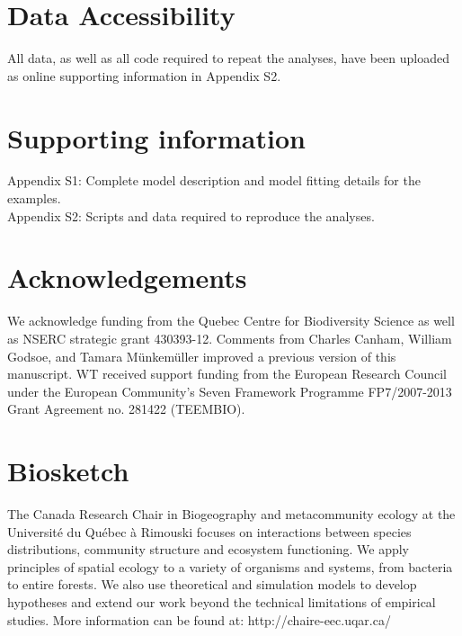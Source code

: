 \documentclass[11pt]{article}
\begin{document}
\section*{Data Accessibility}
All data, as well as all code required to repeat the analyses, have been uploaded as online supporting information in Appendix S2.


%
%
\section*{Supporting information}
Appendix S1: Complete model description and model fitting details for the examples. \\
Appendix S2: Scripts and data required to reproduce the analyses.

\section*{Acknowledgements}
We acknowledge funding from the Quebec Centre for Biodiversity Science as well as NSERC strategic grant 430393-12. Comments from Charles Canham, William Godsoe, and Tamara Münkemüller improved a previous version of this manuscript. WT received support funding from the European Research Council under the European Community's Seven Framework Programme FP7/2007-2013 Grant Agreement no. 281422 (TEEMBIO). 

\nolinenumbers

%
%

\renewcommand\refname{Literature Cited}
{}



%
%

\section*{Biosketch}
The Canada Research Chair in Biogeography and metacommunity ecology at the Université du Québec à Rimouski focuses on interactions between species distributions, community structure and ecosystem functioning.
We apply principles of spatial ecology to a variety of organisms and systems, from bacteria to entire forests.
We also use theoretical and simulation models to develop hypotheses and extend our work beyond the technical limitations of empirical studies.
More information can be found at: http://chaire-eec.uqar.ca/
\end{document}
